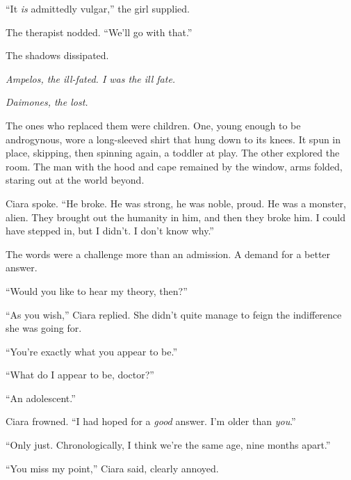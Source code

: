 ``It \emph{is} admittedly vulgar,'' the girl supplied.



The therapist nodded.  ``We'll go with that.''



The shadows dissipated.



\emph{Ampelos, the ill-fated.  I was the ill fate.}



\emph{Daimones, the lost.}



The ones who replaced them were children.  One, young enough to be androgynous, wore a long-sleeved shirt that hung down to its knees.  It spun in place, skipping, then spinning again, a toddler at play.  The other explored the room.  The man with the hood and cape remained by the window, arms folded, staring out at the world beyond.



Ciara spoke.  ``He broke.  He was strong, he was noble, proud.  He was a monster, alien.  They brought out the humanity in him, and then they broke him.  I could have stepped in, but I didn't.  I don't know why.''



The words were a challenge more than an admission.  A demand for a better answer.



``Would you like to hear my theory, then?''



``As you wish,'' Ciara replied.  She didn't quite manage to feign the indifference she was going for.



``You're exactly what you appear to be.''



``What do I appear to be, doctor?''



``An adolescent.''



Ciara frowned.  ``I had hoped for a \emph{good} answer.  I'm older than \emph{you}.''



``Only just.  Chronologically, I think we're the same age, nine months apart.''



``You miss my point,'' Ciara said, clearly annoyed.



